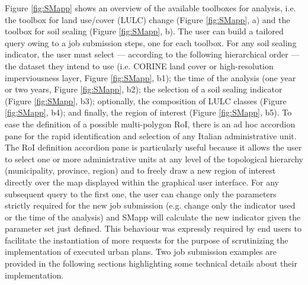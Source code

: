 \documentclass[APA,LATO1COL,doublespace]{WileyNJD-v2}
\begin{document}
Figure \ref{fig:SMapp} shows an overview of the available toolboxes for analysis, i.e. the toolbox for land use/cover (LULC) change (Figure \ref{fig:SMapp}, a) and the toolbox for soil sealing (Figure \ref{fig:SMapp}, b).
The user can build a tailored query owing to a job submission steps, one for each toolbox. 
For any soil sealing indicator, the user must select --- according to the following hierarchical order --- 
the dataset they intend to use (i.e. CORINE land cover or high-resolution imperviousness layer, Figure \ref{fig:SMapp}, b1); 
the time of the analysis (one year or two years, Figure \ref{fig:SMapp}, b2); 
the selection of a soil sealing indicator (Figure \ref{fig:SMapp}, b3); 
optionally, the composition of LULC classes (Figure \ref{fig:SMapp}, b4); 
and finally, the region of interest (Figure \ref{fig:SMapp}, b5). 
To ease the definition of a possible multi-polygon RoI, there is an ad hoc accordion pane for the rapid identification and selection of any Italian administrative unit.
The RoI definition accordion pane is particularly useful because it allows the user to select one or more administrative units at any level of the topological hierarchy (municipality, province, region) and to freely draw a new region of interest directly over the map displayed within the graphical user interface.
For any subsequent query to the first one, the user can change only the parameters strictly required for the new job submission (e.g. change only the indicator used or the time of the analysis) and SMapp will calculate the new indicator given the parameter set just defined. 
This behaviour was expressly required by end users to facilitate the instantiation of more requests for the purpose of scrutinizing the implementation of executed urban plans.
Two job submission examples are provided in the following sections highlighting some technical details about their implementation.
\end{document}
